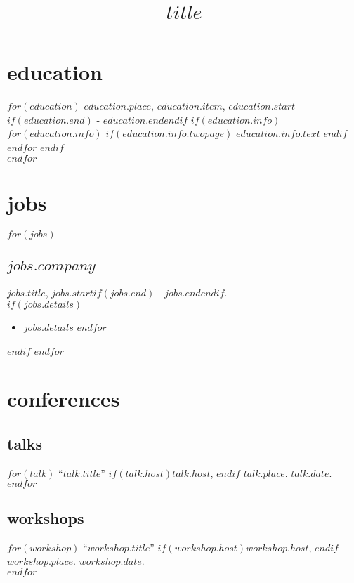 \documentclass[11pt, A4]{article}
\title{$title$}
\begin{document}
\maketitle

\section{education}
$for(education)$
$education.place$, $education.item$, $education.start$$if(education.end)$ - $education.end$$endif$
$if(education.info)$ $for(education.info)$ $if(education.info.twopage)$ $education.info.text$ $endif$ $endfor$ $endif$ \\[.25cm]
$endfor$

\section{jobs}
$for(jobs)$
\subsection{$jobs.company$}
$jobs.title$,
$jobs.start$$if(jobs.end)$ - $jobs.end$$endif$.\\[.25cm]
$if(jobs.details)$
\begin{itemize}
$for(jobs.details)$
\item $jobs.details$
$endfor$
\end{itemize}
$endif$
$endfor$

\section{conferences}

\subsection{talks}
$for(talk)$
``$talk.title$''
$if(talk.host)$$talk.host$, $endif$
$talk.place$.
$talk.date$.\\[.25cm]
$endfor$

\subsection{workshops}
$for(workshop)$
``$workshop.title$''
$if(workshop.host)$$workshop.host$, $endif$
$workshop.place$.
$workshop.date$.\\[.25cm]
$endfor$
\end{document}
